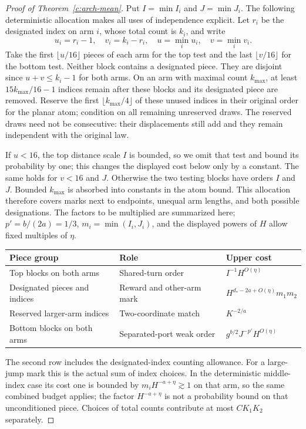 \begin{proof}[Proof of Theorem~\ref{c:arch-mean}]
Put $I=\min I_i$ and $J=\min J_i$. The following deterministic allocation makes all uses of independence explicit. Let $r_i$ be the designated index on arm $i$, whose total count is $k_i$, and write
\[
 u_i=r_i-1,\quad v_i=k_i-r_i,\quad
 u=\min_i u_i,\quad v=\min_i v_i.
\]
Take the first $\lfloor u/16\rfloor$ pieces of each arm for the top test and the last $\lfloor v/16\rfloor$ for the bottom test. Neither block contains a designated piece. They are disjoint since $u+v\le k_i-1$ for both arms. On an arm with maximal count $k_{\max}$, at least $15k_{\max}/16-1$ indices remain after these blocks and its designated piece are removed. Reserve the first $\lfloor k_{\max}/4\rfloor$ of these unused indices in their original order for the planar atom; condition on all remaining unreserved draws. The reserved draws need not be consecutive: their displacements still add and they remain independent with the original law.

If $u<16$, the top distance scale $I$ is bounded, so we omit that test and bound its probability by one; this changes the displayed cost below only by a constant. The same holds for $v<16$ and $J$. Otherwise the two testing blocks have orders $I$ and $J$. Bounded $k_{\max}$ is absorbed into constants in the atom bound. This allocation therefore covers marks next to endpoints, unequal arm lengths, and both possible designations. The factors to be multiplied are summarized here; $p'=b/(2a)=1/3$, $m_i=\min(I_i,J_i)$, and the displayed powers of $H$ allow fixed multiples of $\eta$.
\begin{center}
\begin{tabular}{@{}lll@{}}
\toprule
Piece group & Role & Upper cost \\
\midrule
Top blocks on both arms & Shared-turn order & $I^{-1}H^{O(\eta)}$ \\
Designated pieces and indices & Reward and other-arm mark & $H^{d_*-2a+O(\eta)}m_1m_2$ \\
Reserved larger-arm indices & Two-coordinate match & $K^{-2/a}$ \\
Bottom blocks on both arms & Separated-port weak order & $g^{b/2}J^{-p'}H^{O(\eta)}$ \\
\bottomrule
\end{tabular}
\end{center}
The second row includes the designated-index counting allowance. For a large-jump mark this is the actual sum of index choices. In the deterministic middle-index case its cost one is bounded by $m_iH^{-a+\eta}\gtrsim1$ on that arm, so the same combined budget applies; the factor $H^{-a+\eta}$ is not a probability bound on that unconditioned piece. Choices of total counts contribute at most $CK_1K_2$ separately.


\end{proof}

